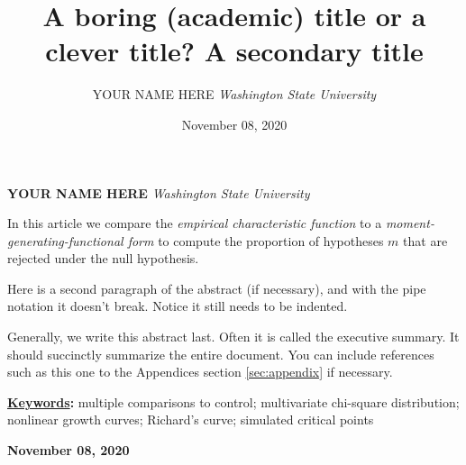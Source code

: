 \documentclass[]{article}
\title{\textbf{\textcolor{WSU.crimson}{A boring (academic) title or a clever title?}} \newline \textbf{\textcolor{WSU.gray}{A secondary title}}  }
\author{\Large YOUR NAME HERE\vspace{0.05in} \newline\normalsize\emph{Washington State University}  }
\date{November 08, 2020}
\newcommand*{\authorfont}{\fontfamily{phv}\selectfont}
\renewenvironment{abstract}
{{%
  \setlength{\leftmargin}{0mm}
  \setlength{\rightmargin}{\leftmargin}%
}%
  \relax}
{\endlist}
\begin{document}
	
%

{%
\setlength{\parindent}{0pt}
\thispagestyle{plain}
{\fontsize{18}{20}\selectfont\raggedright 
\maketitle  %

}

{
   \vskip 13.5pt\relax \normalsize\fontsize{11}{12} 
   
\textbf{\authorfont YOUR NAME HERE} \hskip 15pt \emph{\small Washington State University}   

}

}








\begin{abstract}

    \hbox{\vrule height .2pt width 39.14pc}

    \vskip 8.5pt %

\noindent In this article we compare the \emph{empirical characteristic function}
\citep{Tukey:1977, Becker:1988} to a
\emph{moment-generating-functional form} to compute the proportion of
hypotheses \(m\) that are rejected under the null hypothesis.
\vspace{0.25in}

\noindent Here is a second paragraph of the abstract (if necessary), and
with the pipe notation it doesn't break. Notice it still needs to be
indented. \vspace{0.25in}

\noindent Generally, we write this abstract last. Often it is called the
executive summary. It should succinctly summarize the entire document.
You can include references such as this one to the Appendices section
\ref{sec:appendix} if necessary.


\vskip 8.5pt \noindent \textbf{\underline{Keywords}:} multiple comparisons to control; multivariate chi-square distribution;
nonlinear growth curves; Richard's curve; simulated critical points \par

    




    
    \hbox{\vrule height .2pt width 39.14pc}
    \vskip 5pt 
    \hfill \textbf{\textcolor{WSU.gray}{ November 08, 2020 } }
    \vskip 5pt 
    
\end{abstract}
\end{document}

